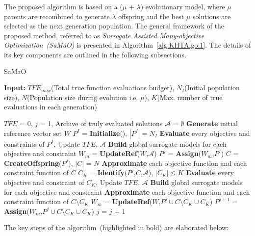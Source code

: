 The proposed algorithm is based on a ($\mu$ + $\lambda$) evolutionary model, where $\mu$ parents are recombined to generate $\lambda$ offspring and the best $\mu$ solutions are selected as the next generation population. The general framework of the proposed method, referred to as \textit{Surrogate Assisted Many-objective Optimization~(SaMaO)} is presented in Algorithm~\ref{alg:KHTAlgo:1}. The details of its key components are outlined in the following subsections. 

{\color{blue}
	\begin{algorithm}[!ht]\footnotesize
		\caption{SaMaO}
		\textbf{Input:} $TFE_{max}$\hspace{1mm}(Total true function evaluations budget), $N_I$\hspace{1mm}(Initial population size), $N$\hspace{1mm}(Population size during evolution i.e. $\mu$), $K$\hspace{1mm}(Max. number of true evaluations in each generation)
		{\color{blue}
			\begin{algorithmic}[1]
				\STATE $TFE$ = 0, $j$ = 1, Archive of truly evaluated solutions $\mathcal{A}$ = $\emptyset$
				\STATE \textbf{Generate} initial reference vector set $W$ 
				\STATE $P^I$ = \textbf{Initialize}(), $\left|P^I\right| = N_I$ 
				\STATE \textbf{Evaluate} every objective and constraints of $P^I$, Update $TFE$, $\mathcal{A}$ 
				\STATE \textbf{Build} global surrogate models for each objective and constraint
				\STATE $W_m$ = \textbf{UpdateRef}($W$,$\mathcal{A}$)
				\STATE $P^j$ = \textbf{Assign}($W_m$,$P^I$) 	
				\STATE $C$ = \textbf{CreateOffspring}($P^j$), $\left|C\right|$ = $N$
				\STATE \textbf{Approximate} each objective function and each constraint function of $C$
				\STATE $C_K$ = \textbf{Identify}($P^j$,$C$,$\mathcal{A}$), $\left|C_K\right| \le K$
				\STATE \textbf{Evaluate} every objective and constraint of $C_K$, Update $TFE$, $\mathcal{A}$
				\STATE \textbf{Build} global surrogate models for each objective and constraint
				\STATE \textbf{Approximate} each objective function and each constraint function of $C \setminus C_K$
				\STATE $W_m$ = \textbf{UpdateRef}($W$,$P^j \cup C \setminus C_K \cup C_K$)
				\STATE $P^{j+1}$ = \textbf{Assign}($W_m$,$P^j \cup C \setminus C_K \cup C_K$)   
				\STATE $j$ = $j$ + 1
				\ENDWHILE			
			\end{algorithmic}
		}
		\label{alg:KHTAlgo:1}
	\end{algorithm}
}
The key steps of the algorithm~(highlighted in bold) are elaborated below:\\

